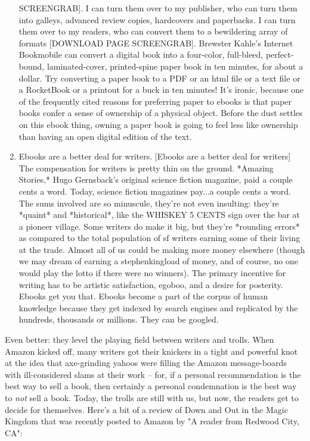\begin{enumerate}
  SCREENGRAB]. I can turn them over to my publisher, who can turn
  them into galleys, advanced review copies, hardcovers and
  paperbacks. I can turn them over to my readers, who can convert
  them to a bewildering array of formats [DOWNLOAD PAGE SCREENGRAB].
  Brewster Kahle's Internet Bookmobile can convert a digital book
  into a four-color, full-bleed, perfect-bound, laminated-cover,
  printed-spine paper book in ten minutes, for about a dollar. Try
  converting a paper book to a PDF or an html file or a text file or
  a RocketBook or a printout for a buck in ten minutes! It's ironic,
  because one of the frequently cited reasons for preferring paper to
  ebooks is that paper books confer a sense of ownership of a
  physical object. Before the dust settles on this ebook thing,
  owning a paper book is going to feel less like ownership than
  having an open digital edition of the text.
\item
  Ebooks are a better deal for writers. [Ebooks are a better deal for
  writers] The compensation for writers is pretty thin on the ground.
  *Amazing Stories,* Hugo Gernsback's original science fiction
  magazine, paid a couple cents a word. Today, science fiction
  magazines pay...a couple cents a word. The sums involved are so
  minuscule, they're not even insulting: they're *quaint* and
  *historical*, like the WHISKEY 5 CENTS sign over the bar at a
  pioneer village. Some writers do make it big, but they're *rounding
  errors* as compared to the total population of sf writers earning
  some of their living at the trade. Almost all of us could be making
  more money elsewhere (though we may dream of earning a
  stephenkingload of money, and of course, no one would play the
  lotto if there were no winners). The primary incentive for writing
  has to be artistic satisfaction, egoboo, and a desire for
  posterity. Ebooks get you that. Ebooks become a part of the corpus
  of human knowledge because they get indexed by search engines and
  replicated by the hundreds, thousands or millions. They can be
  googled.
\end{enumerate}
Even better: they level the playing field between writers and
trolls. When Amazon kicked off, many writers got their knickers in
a tight and powerful knot at the idea that axe-grinding yahoos were
filling the Amazon message-boards with ill-considered slams at
their work -- for, if a personal recommendation is the best way to
sell a book, then certainly a personal condemnation is the best way
to \emph{not} sell a book. Today, the trolls are still with us,
but now, the readers get to decide for themselves. Here's a bit of
a review of Down and Out in the Magic Kingdom that was recently
posted to Amazon by "A reader from Redwood City, CA":

